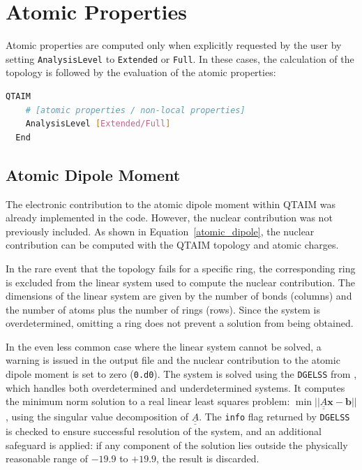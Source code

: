 \newpage
\section{Atomic Properties}

Atomic properties are computed only when explicitly requested by the user by
setting \texttt{AnalysisLevel} to \texttt{Extended} or \texttt{Full}. In these
cases, the calculation of the topology is followed by the evaluation of the
atomic properties:

\begin{lstlisting}[language=bash]
  QTAIM
    # [atomic properties / non-local properties]
    AnalysisLevel [Extended/Full]
  End 
\end{lstlisting}

\subsection{Atomic Dipole Moment}

The electronic contribution to the atomic dipole moment within
\gls{QTAIM} was already implemented in the \ams code.
However, the nuclear contribution was not previously included. As shown
in Equation~\ref{atomic_dipole}, the nuclear contribution can be computed
with the \gls{QTAIM} topology and atomic charges.

In the rare event that the topology fails for a specific ring, the
corresponding ring is excluded from the linear system used to compute the
nuclear contribution. The dimensions of the linear system are given by the
number of bonds (columns) and the number of atoms plus the number of rings
(rows).  Since the system is overdetermined, omitting a ring does not prevent a
solution from being obtained.

In the even less common case where the linear system cannot be solved, a
warning is issued in the output file and the nuclear contribution to the atomic
dipole moment is set to zero (\texttt{0.d0}). The system is solved using the
\texttt{DGELSS} \subroutine from \lapack, which handles both overdetermined and
underdetermined systems. It computes the minimum norm solution to a real linear
least squares problem: $\min || \underline{\underline{A}}\mathbf{x} -
\mathbf{b} ||$, using the singular value decomposition of
$\underline{\underline{A}}$.  The \texttt{info} flag returned by
\texttt{DGELSS} is checked to ensure successful resolution of the system, and
an additional safeguard is applied: if any component of the solution lies
outside the physically reasonable range of $-19.9$ to $+19.9$, the result is
discarded.

